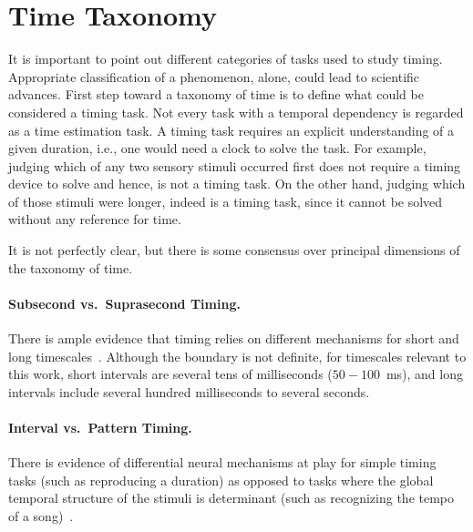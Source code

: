 \section[Time Taxonomy]{Time Taxonomy} \label{ch:intro:taxonomy}
It is important to point out different categories of tasks used to study timing.\footnotemark
Appropriate classification of a phenomenon, alone, could lead to scientific advances.
First step toward a taxonomy of time is to define what could be considered a timing task.
Not every task with a temporal dependency is regarded as a time estimation task.
A timing task requires an explicit understanding of a given duration, i.e., one would need a clock to solve the task.
For example, judging which of any two sensory stimuli occurred first does not require a timing device to solve and hence, is not a timing task.
On the other hand, judging which of those stimuli were longer, indeed is a timing task, since it cannot be solved without any reference for time.
\par
It is not perfectly clear, but there is some consensus over principal dimensions of the taxonomy of time.

\paragraph{Subsecond vs.\ Suprasecond Timing.} \label{ch:intro:taxonomy:SUBvsSUPRA}
There is ample evidence that timing relies on different mechanisms for short and long timescales~\cite[see][]{Paton2018NeuronRev}.
Although the boundary is not definite, for timescales relevant to this work, short intervals are several tens of milliseconds ($50-100$~ms), and long intervals include several hundred milliseconds to several seconds.

\paragraph{Interval vs.\ Pattern Timing.} \label{ch:intro:taxonomy:INTvsPAT}
There is evidence of differential neural mechanisms at play for simple timing tasks (such as reproducing a duration) as  opposed to tasks where the global temporal structure of the stimuli is determinant (such as recognizing the tempo of a song)~\cite{teki2011}.

